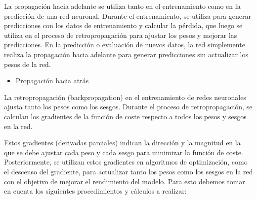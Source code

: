 La propagación hacia adelante se utiliza tanto en el entrenamiento como en la predicción de una red neuronal. Durante el entrenamiento, se utiliza para generar predicciones con los datos de entrenamiento y calcular la pérdida, que luego se utiliza en el proceso de retropropagación para ajustar los pesos y mejorar las predicciones. En la predicción o evaluación de nuevos datos, la red simplemente realiza la propagación hacia adelante para generar predicciones sin actualizar los pesos de la red.

\begin{itemize}
\item{Propagación hacia atrás}
\end{itemize}

La retropropagación (backpropagation) en el entrenamiento de redes neuronales ajusta tanto los pesos como los sesgos. Durante el proceso de retropropagación, se calculan los gradientes de la función de coste respecto a todos los pesos y sesgos en la red.

Estos gradientes (derivadas parciales) indican la dirección y la magnitud en la que se debe ajustar cada peso y cada sesgo para minimizar la función de coste. Posteriormente, se utilizan estos gradientes en algoritmos de optimización, como el descenso del gradiente, para actualizar tanto los pesos como los sesgos en la red con el objetivo de mejorar el rendimiento del modelo. Para esto debemos tomar en cuenta los siguientes procedimientos y cálculos a realizar:

